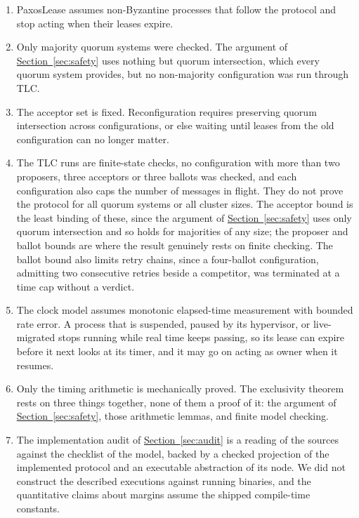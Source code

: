 \documentclass[final,5p,times,twocolumn,number]{elsarticle}
\newcommand{\secref}[1]{\hyperref[#1]{Section~\ref*{#1}}}
\begin{document}
\begin{enumerate}\itemsep0.25em
\item PaxosLease assumes non-Byzantine processes that follow the protocol and stop acting when their leases expire.
\item Only majority quorum systems were checked.  The argument of \secref{sec:safety} uses nothing but quorum intersection, which every quorum system provides, but no non-majority configuration was run through TLC.
\item The acceptor set is fixed.  Reconfiguration requires preserving quorum intersection across configurations, or else waiting until leases from the old configuration can no longer matter.
\item The TLC runs are finite-state checks, no configuration with more than two proposers, three acceptors or three ballots was checked, and each configuration also caps the number of messages in flight.  They do not prove the protocol for all quorum systems or all cluster sizes.  The acceptor bound is the least binding of these, since the argument of \secref{sec:safety} uses only quorum intersection and so holds for majorities of any size; the proposer and ballot bounds are where the result genuinely rests on finite checking.  The ballot bound also limits retry chains, since a four-ballot configuration, admitting two consecutive retries beside a competitor, was terminated at a time cap without a verdict.
\item The clock model assumes monotonic elapsed-time measurement with bounded rate error.  A process that is suspended, paused by its hypervisor, or live-migrated stops running while real time keeps passing, so its lease can expire before it next looks at its timer, and it may go on acting as owner when it resumes.
\item Only the timing arithmetic is mechanically proved.  The exclusivity theorem rests on three things together, none of them a proof of it: the argument of \secref{sec:safety}, those arithmetic lemmas, and finite model checking.
\item The implementation audit of \secref{sec:audit} is a reading of the sources against the checklist of the model, backed by a checked projection of the implemented protocol and an executable abstraction of its node.  We did not construct the described executions against running binaries, and the quantitative claims about margins assume the shipped compile-time constants.
\end{enumerate}
\end{document}
